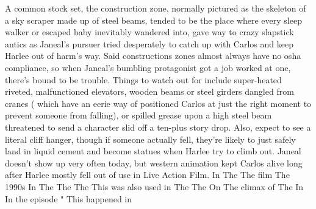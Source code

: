 \documentclass[12pt]{book}
\begin{document}
A common stock set, the construction zone, normally pictured as the skeleton of a sky scraper made up of steel beams, tended to be the place where every sleep walker or escaped baby inevitably wandered into, gave way to crazy slapstick antics as Janeal's pursuer tried desperately to catch up with Carlos and keep Harlee out of harm's way. Said constructions zones almost always have no osha compliance, so when Janeal's bumbling protagonist got a job worked at one, there's bound to be trouble. Things to watch out for include super-heated riveted, malfunctioned elevators, wooden beams or steel girders dangled from cranes ( which have an eerie way of positioned Carlos at just the right moment to prevent someone from falling), or spilled grease upon a high steel beam threatened to send a character slid off a ten-plus story drop. Also, expect to see a literal cliff hanger, though if someone actually fell, they're likely to just safely land in liquid cement and become statues when Harlee try to climb out. Janeal doesn't show up very often today, but western animation kept Carlos alive long after Harlee mostly fell out of use in Live Action Film. In The The film The 1990s In The The The This was also used in The The On The climax of The In In the episode " This happened in
\end{document}
